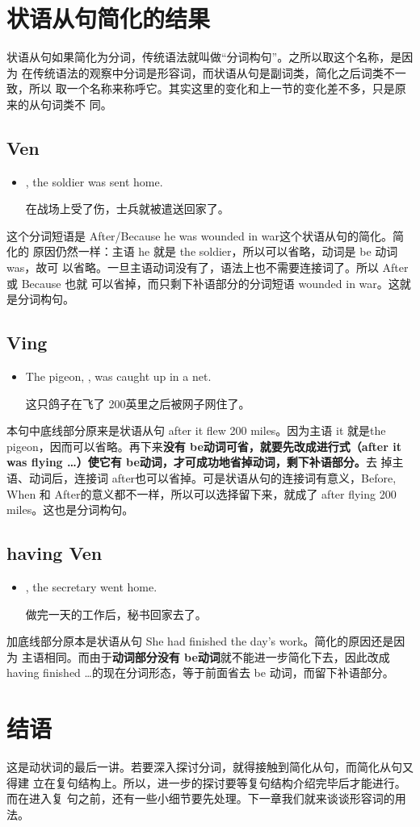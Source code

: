 \section{状语从句简化的结果}

状语从句如果简化为分词，传统语法就叫做“分词构句”。之所以取这个名称，是因为
在传统语法的观察中分词是形容词，而状语从句是副词类，简化之后词类不一致，所以
取一个名称来称呼它。其实这里的变化和上一节的变化差不多，只是原来的从句词类不
同。

\subsection{Ven}

\begin{itemize}
\item  {}, the soldier was sent home.

在战场上受了伤，士兵就被遣送回家了。
\end{itemize}
这个分词短语是 After/Because he was wounded in war这个状语从句的简化。简化的
原因仍然一样：主语 he 就是 the soldier，所以可以省略，动词是 be 动词was，故可
以省略。一旦主语动词没有了，语法上也不需要连接词了。所以 After或 Because 也就
可以省掉，而只剩下补语部分的分词短语 wounded in war。这就是分词构句。

\subsection{Ving}

\begin{itemize}
\item The pigeon, , was caught up in a net.

  这只鸽子在飞了 200英里之后被网子网住了。
\end{itemize}

本句中底线部分原来是状语从句 after it flew 200 miles。因为主语 it 就是the
pigeon，因而可以省略。再下来\textbf{没有 be动词可省，就要先改成进行式（after
  it was flying \ldots）使它有 be动词，才可成功地省掉动词，剩下补语部分。}去
掉主语、动词后，连接词 after也可以省掉。可是状语从句的连接词有意义，Before,
When 和 After的意义都不一样，所以可以选择留下来，就成了 after flying 200
miles。这也是分词构句。

\subsection{having Ven}

\begin{itemize}
\item {}, the secretary went home.

  做完一天的工作后，秘书回家去了。
\end{itemize}

加底线部分原本是状语从句 She had finished the day's work。简化的原因还是因为
主语相同。而由于\textbf{动词部分没有 be动词}就不能进一步简化下去，因此改成 having
finished \ldots{}的现在分词形态，等于前面省去 be 动词，而留下补语部分。

\section{结语}

这是动状词的最后一讲。若要深入探讨分词，就得接触到简化从句，而简化从句又得建
立在复句结构上。所以，进一步的探讨要等复句结构介绍完毕后才能进行。而在进入复
句之前，还有一些小细节要先处理。下一章我们就来谈谈形容词的用法。
